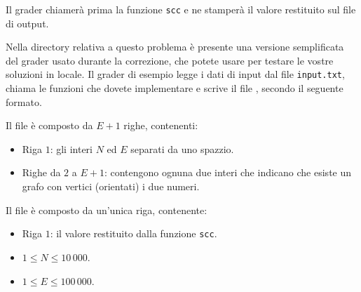 \medskip

Il grader chiamerà prima la funzione \texttt{scc} e ne stamperà il valore restituito sul file di output.



\Grader
Nella directory relativa a questo problema è presente una versione semplificata del grader usato durante la correzione, che potete usare per testare le vostre soluzioni in locale. Il grader di esempio legge i dati di input dal file \texttt{input.txt}, chiama le funzioni che dovete implementare e scrive il file \outputfile{}, secondo il seguente formato.

Il file  è composto da $E+1$ righe, contenenti:
\begin{itemize}[nolistsep,itemsep=2mm]
\item Riga $1$: gli interi $N$ ed $E$ separati da uno spazzio.
\item Righe da $2$ a $E+1$: contengono ognuna due interi che indicano che esiste un grafo con vertici (orientati) i due numeri.
\end{itemize}

Il file \outputfile{} è composto da un'unica riga, contenente:
\begin{itemize}[nolistsep,itemsep=2mm]
\item Riga $1$: il valore restituito dalla funzione \texttt{scc}.
\end{itemize}



\Constraints

\begin{itemize}[nolistsep, itemsep=2mm]
	\item $1 \le N \le 10\,000$.
	\item $1 \le E \le 100\,000$.
\end{itemize}



\Examples

\begin{example}
%
\end{example}

